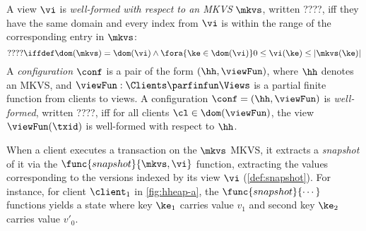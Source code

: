\begin{definition}[Configurations]
A view $\vi$ is \emph{well-formed with respect to an MKVS} $\mkvs$, written ????,  iff they have the same domain and every index from $\vi$ is within the range of the corresponding entry in $\mkvs$: 
\[
   ???? \iffdef  \dom(\mkvs) = \dom(\vi) \land \fora{\ke \in \dom(\vi)} 0 \leq \vi(\ke) \le \lvert \mkvs(\ke) \rvert
\]
%
A \emph{configuration} $\conf$ is a pair of the form $(\hh, \viewFun)$, where $\hh$ denotes an MKVS, and $\viewFun: \Clients \parfinfun \Views$ is a partial finite function from clients to views. 
A configuration $\conf = (\hh, \viewFun)$ is \emph{well-formed}, written ????, iff for all clients $\cl \in \dom(\viewFun)$, the view $\viewFun(\txid)$ is well-formed with respect to $\hh$. 

\end{definition}

 When a client executes a transaction on the $\mkvs$ MKVS, it extracts a \emph{snapshot} of it via the \( \func{snapshot}{\mkvs, \vi} \) function, extracting the values corresponding to the versions indexed by its view \( \vi \) (\cref{def:snapshot}).
For instance, for client \( \client_1 \) in \cref{fig:hheap-a}, the $\func{snapshot}{\cdots}$ functions yields a state where key $\ke_1$ carries value $v_1$ and second key \( \ke_2 \) carries value $v'_0$.

